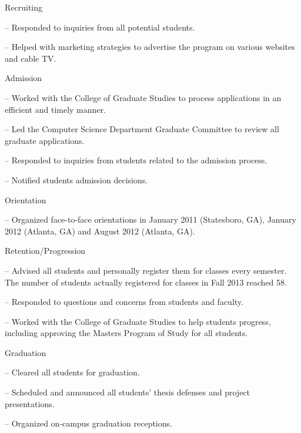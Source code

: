 \documentclass[10pt]{article}
\begin{document}
\begin{outerlist}

\item Recruiting
\begin{innerlist}
\item [--]Responded to inquiries from all potential students.
\item[--]Helped with marketing strategies to advertise the program on various websites and cable TV.  
\end{innerlist}

\item Admission
\begin{innerlist}
\item[--] Worked with the College of Graduate Studies to process applications in an efficient and timely manner.
\item[--] Led the Computer Science Department Graduate Committee to review all graduate applications.
\item[--] Responded to inquiries from students related to the admission process.
\item[--] Notified students admission decisions.
\end{innerlist}

\item Orientation
\begin{innerlist}
\item[--] Organized face-to-face orientations in January 2011 (Statesboro, GA), January 2012 (Atlanta, GA) and August 2012 (Atlanta, GA).  
\end{innerlist}

\item Retention/Progression
\begin{innerlist}
\item[--] Advised all students and personally register them for classes every semester. The number of students actually registered for classes in Fall 2013 reached 58.
\item[--] Responded to questions and concerns from students and faculty.
\item[--] Worked with the College of Graduate Studies to help students progress, including approving the Masters Program of Study for all students.
\end{innerlist}

\item Graduation
\begin{innerlist}
\item[--] Cleared all students for graduation.
\item[--] Scheduled and announced all students' thesis defenses and project presentations.
\item[--]  Organized on-campus graduation receptions.
\end{innerlist}


\end{outerlist}
\end{document}
